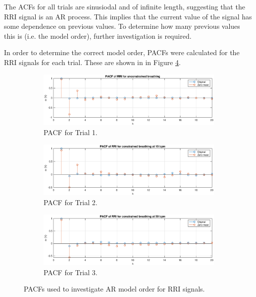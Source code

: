 \noindent
The ACFs for all trials are sinusiodal and of infinite length, suggesting that the RRI signal is an AR process. This implies that the current value of the signal has some dependence on previous values. To determine how many previous values this is (i.e. the model order), further investigation is required.

\vspace{0.5cm}
\noindent
In order to determine the correct model order, PACFs were  calculated for the RRI signals for each trial. These are shown in in Figure \ref{fig:HRstuff}.

\begin{figure}[H]
    \begin{center}
\begin{subfigure}{0.6\textwidth}
  \includegraphics[width=\linewidth]{assignment2figs/pacf_uncon.eps}
  \caption{PACF for Trial 1.}
  \label{fig:pacfuncon}
\end{subfigure}\hfil 
\medskip
\begin{subfigure}{0.6\textwidth}
  \includegraphics[width=\linewidth]{assignment2figs/pacf_15.eps}
  \caption{PACF for Trial 2.}
  \label{fig:pacf15}
\end{subfigure}\hfil 
\medskip
\begin{subfigure}{0.6\textwidth}
  \includegraphics[width=\linewidth]{assignment2figs/pacf_50.eps}
  \caption{PACF for Trial 3.}
  \label{fig:pacf50}
\end{subfigure}
\caption{PACFs used to investigate AR model order for RRI signals.}
\label{fig:HRstuff}
\end{center}
\end{figure}

